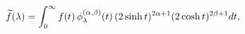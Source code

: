 \[\widetilde{f}(\lambda)=\int_{0}^{\infty}f(t)\mathop{\phi^{(\alpha,\beta)}_{%
\lambda}\/}\nolimits\!\left(t\right)(2\mathop{\sinh\/}\nolimits t)^{2\alpha+1}%
(2\mathop{\cosh\/}\nolimits t)^{2\beta+1}dt,\]